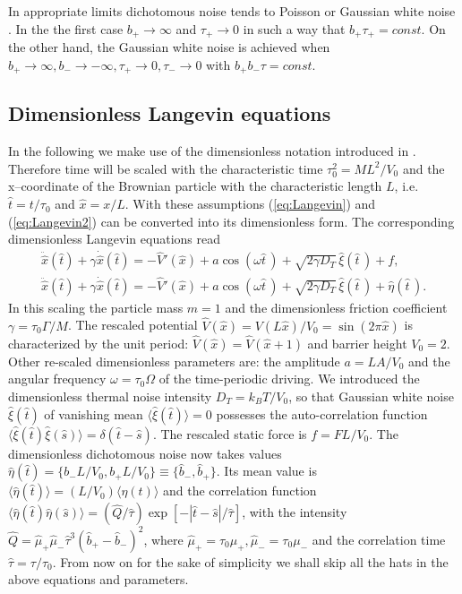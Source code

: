 \documentclass[12pt]{iopart}
\begin{document}
In appropriate limits dichotomous noise tends to Poisson or Gaussian white noise \cite{broeck}. In the the first case $b_+ \to \infty$ and $\tau_+ \to 0$ in such a way that $b_+\tau_+=const.$ On the other hand, the Gaussian white 
noise is achieved when $b_+ \to \infty, b_- \to -\infty, \tau_+ \to 0, \tau_- \to 0$ with $b_+b_-\tau=const$.
\subsection{Dimensionless Langevin equations}
In the following we make use of the dimensionless notation introduced in \cite{MacKos2004}. Therefore time will be scaled with the characteristic time $\tau_0^2 = M L^2 / V_0$ and the x--coordinate of the Brownian particle with the characteristic length $L$, i.e. $\hat{t} = t/\tau_0$ and $\hat{x} = x/L$. With these assumptions (\ref{eq:Langevin}) and (\ref{eq:Langevin2}) can be converted into its dimensionless form. The corresponding dimensionless Langevin equations read
\begin{eqnarray}
\ddot{\hat{x}}(\hat{t}) + \gamma \dot{\hat{x}}(\hat{t}) =-  \hat{V}'(\hat{x}) + a \cos (\omega \hat{t}\, ) + \sqrt{2\gamma D_T} \, {\hat\xi}({\hat t}\,) + f, \label{eq:dLangevin1}\\
\ddot{\hat{x}}(\hat{t}) + \gamma \dot{\hat{x}}(\hat{t}) =-  \hat{V}'(\hat{x}) +  a \cos (\omega \hat{t}\, ) + \sqrt{2\gamma D_T} \,{\hat\xi}({\hat t}\,) + \hat{\eta}({\hat t}\,). \label{eq:dLangevin2}
\end{eqnarray}
In this scaling the particle mass $m =1$  and the dimensionless  
friction coefficient \mbox{$\gamma = \tau_0 \Gamma / M$}. The rescaled potential $\hat{V}(\hat{x}) = V(L\hat{x})/V_0 = \sin(2\pi \hat{x})$ is characterized by the unit period:  $\hat{V}(\hat{x}) = \hat{V}(\hat{x} +1)$ and barrier height $V_0 = 2$. Other re-scaled dimensionless parameters are: the amplitude $a = LA/V_0$ and the angular frequency $\omega = \tau_0 \Omega$ of the time-periodic driving. We introduced the dimensionless thermal noise intensity \mbox{$D_T = k_BT/V_0$}, so that  Gaussian white noise $\hat{\xi}(\hat{t})$ of vanishing mean $\langle\hat{\xi}(\hat{t})\rangle =0$ possesses the auto-correlation function $\langle \hat{\xi}(\hat{t})\hat{\xi}(\hat{s}) \rangle = \delta(\hat{t} - \hat{s})$. The rescaled static force is $f = F L / V_0$. The dimensionless dichotomous noise now takes values $\hat{\eta}(\hat{t}) = \{b_- L / V_0, b_+ L / V_0\} \equiv \{ \hat{b}_-, \hat{b}_+\}$. Its mean value is $\langle \hat{\eta} (\hat{t}) \rangle = (L/V_0) \langle \eta(t) \rangle$ and the correlation function $\langle \hat{\eta}(\hat{t}) \hat{\eta}(\hat{s}) \rangle = (\hat{Q} / \hat{\tau}) \exp[-|\hat{t} - \hat{s}|/\hat{\tau}]$, with the intensity $\hat{Q} = \hat{\mu}_+ \hat{\mu}_- \hat{\tau}^3 (\hat{b}_+ - \hat{b}_-)^2 $, where $\hat{\mu}_+ =\tau_0 \mu_+, \hat{\mu}_- =\tau_0 \mu_-$ and the correlation time $\hat{\tau} = \tau / \tau_0$. From now on for the sake of simplicity we shall skip all the hats in the above equations and parameters.
\end{document}
